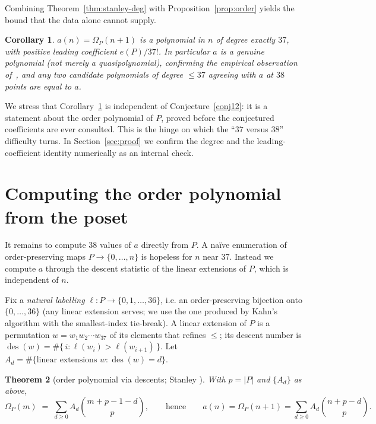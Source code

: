 \documentclass[11pt]{article}
\theoremstyle{plain}
\newtheorem{theorem}{Theorem}
\newtheorem{corollary}[theorem]{Corollary}
\theoremstyle{definition}
\theoremstyle{remark}
\newcommand{\Om}{\Omega}
\newcommand{\des}{\operatorname{des}}
\begin{document}
Combining Theorem~\ref{thm:stanley-deg} with Proposition~\ref{prop:order} yields the bound that
the data alone cannot supply.

\begin{corollary}\label{cor:deg37}
$a(n)=\Om_P(n+1)$ is a polynomial in $n$ of degree exactly $37$, with positive leading
coefficient $e(P)/37!$. In particular $a$ is a genuine polynomial (not merely a
quasipolynomial), confirming the empirical observation of~\cite{KK23}, and any two candidate
polynomials of degree $\le 37$ agreeing with $a$ at $38$ points are equal to $a$.
\end{corollary}

We stress that Corollary~\ref{cor:deg37} is independent of Conjecture~\ref{conj12}: it is a
statement about the order polynomial of $P$, proved before the conjectured coefficients are
ever consulted. This is the hinge on which the ``$37$ versus $38$'' difficulty turns. In
Section~\ref{sec:proof} we confirm the degree and the leading-coefficient identity numerically
as an internal check.

\section{Computing the order polynomial from the poset}\label{sec:compute}

It remains to compute $38$ values of $a$ directly from $P$. A na\"ive enumeration of
order-preserving maps $P\to\{0,\dots,n\}$ is hopeless for $n$ near $37$. Instead we compute $a$
through the descent statistic of the linear extensions of $P$, which is independent of $n$.

Fix a \emph{natural labelling} $\ell:P\to\{0,1,\dots,36\}$, i.e. an order-preserving bijection
onto $\{0,\dots,36\}$ (any linear extension serves; we use the one produced by Kahn's algorithm
with the smallest-index tie-break). A linear extension of $P$ is a permutation
$w=w_1w_2\cdots w_{37}$ of its elements that refines $\le$; its descent number is
$\des(w)=\#\{\,i:\ell(w_i)>\ell(w_{i+1})\,\}$. Let
$A_d=\#\{\text{linear extensions } w:\des(w)=d\}$.

\begin{theorem}[order polynomial via descents; Stanley {\cite[\S3.15.2]{EC1}}]\label{thm:descent}
With $p=|P|$ and $\{A_d\}$ as above,
\[
  \Om_P(m)\;=\;\sum_{d\ge 0} A_d\binom{m+p-1-d}{p},
  \qquad\text{hence}\qquad
  a(n)=\Om_P(n+1)=\sum_{d\ge 0} A_d\binom{n+p-d}{p}.
\]
\end{theorem}
\end{document}
